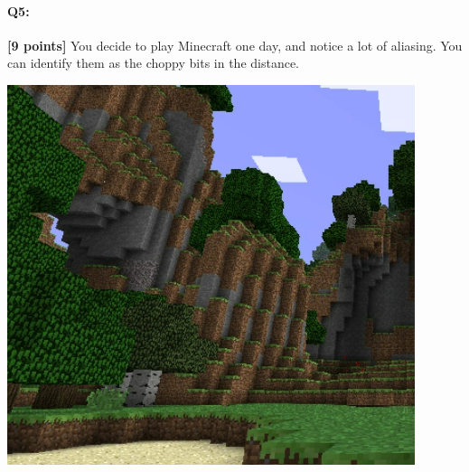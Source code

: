 


\pagebreak
\paragraph{Q5:} \textbf{[9 points]} You decide to play Minecraft one day, and notice a lot of aliasing. You can identify them as the choppy bits in the distance.

\includegraphics[width=\textwidth * 5/10]{images/aliased-minecraft.png}




